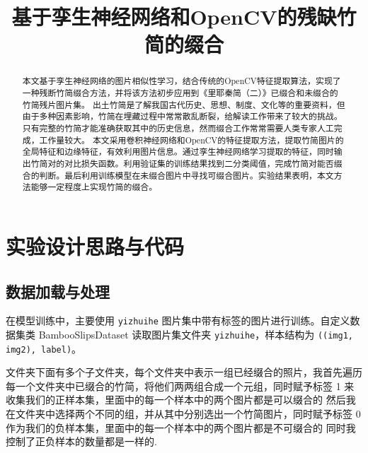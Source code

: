 \documentclass{article}
\title{基于孪生神经网络和OpenCV的残缺竹简的缀合}
\author{}
\date{}
\begin{document}
\maketitle

\begin{abstract}
本文基于孪生神经网络的图片相似性学习，结合传统的OpenCV特征提取算法，实现了一种残断竹简缀合方法，并将该方法初步应用到《里耶秦简（二）》已缀合和未缀合的竹简残片图片集。
出土竹简是了解我国古代历史、思想、制度、文化等的重要资料，但由于多种因素影响，竹简在埋藏过程中常常散乱断裂，给解读工作带来了较大的挑战。只有完整的竹简才能准确获取其中的历史信息，然而缀合工作常常需要人类专家人工完成，工作量较大。
本文采用卷积神经网络和OpenCV的特征提取方法，提取竹简图片的全局特征和边缘特征，有效利用图片信息。通过孪生神经网络学习提取的特征，同时输出竹简对的对比损失函数。利用验证集的训练结果找到二分类阈值，完成竹简对能否缀合的判断。最后利用训练模型在未缀合图片中寻找可缀合图片。实验结果表明，本文方法能够一定程度上实现竹简的缀合。
\end{abstract}

\section{实验设计思路与代码}

\subsection{数据加载与处理}

在模型训练中，主要使用 \texttt{yizhuihe} 图片集中带有标签的图片进行训练。自定义数据集类 BambooSlipsDataset 读取图片集文件夹 \texttt{yizhuihe}，样本结构为 \texttt{((img1, img2), label)}。

文件夹下面有多个子文件夹，每个文件夹中表示一组已经缀合的照片，我首先遍历每一个文件夹中已缀合的竹简，将他们两两组合成一个元组，同时赋予标签 1 来收集我们的正样本集，里面中的每一个样本中的两个图片都是可以缀合的
然后我在文件夹中选择两个不同的组，并从其中分别选出一个竹简图片，同时赋予标签 0 作为我们的负样本集，里面中的每一个样本中的两个图片都是不可缀合的
同时我控制了正负样本的数量都是一样的.
\end{document}
